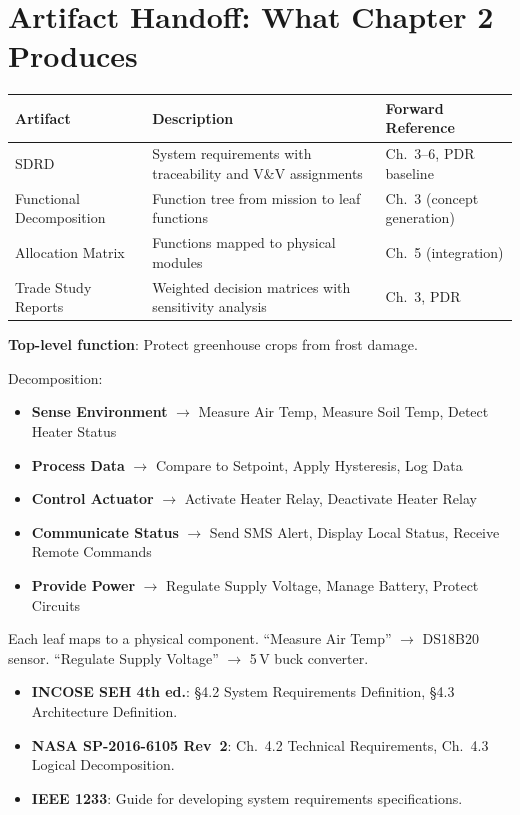 \documentclass[11pt,letterpaper,twoside,openany]{book}
\begin{document}
\section{Artifact Handoff: What Chapter 2 Produces}
\begin{table}[htbp]\centering\small
\begin{tabularx}{\textwidth}{l X l}
\toprule
\textbf{Artifact} & \textbf{Description} & \textbf{Forward Reference} \\
\midrule
SDRD & System requirements with traceability and V\&V assignments & Ch.~3--6, PDR baseline \\
Functional Decomposition & Function tree from mission to leaf functions & Ch.~3 (concept generation) \\
Allocation Matrix & Functions mapped to physical modules & Ch.~5 (integration) \\
Trade Study Reports & Weighted decision matrices with sensitivity analysis & Ch.~3, PDR \\
\bottomrule
\end{tabularx}
\end{table}


\begin{greenshieldbox}
\textbf{Top-level function}: Protect greenhouse crops from frost damage.

Decomposition:
\begin{itemize}[nosep,leftmargin=1.5em]
\item \textbf{Sense Environment} $\to$ Measure Air Temp, Measure Soil Temp, Detect Heater Status
\item \textbf{Process Data} $\to$ Compare to Setpoint, Apply Hysteresis, Log Data
\item \textbf{Control Actuator} $\to$ Activate Heater Relay, Deactivate Heater Relay
\item \textbf{Communicate Status} $\to$ Send SMS Alert, Display Local Status, Receive Remote Commands
\item \textbf{Provide Power} $\to$ Regulate Supply Voltage, Manage Battery, Protect Circuits
\end{itemize}
Each leaf maps to a physical component. ``Measure Air Temp'' $\to$ DS18B20 sensor. ``Regulate Supply Voltage'' $\to$ 5\,V buck converter.
\end{greenshieldbox}

\begin{keyconceptbox}
\begin{itemize}[nosep,leftmargin=1.5em]
\item \textbf{INCOSE SEH 4th ed.}: \S4.2 System Requirements Definition, \S4.3 Architecture Definition.
\item \textbf{NASA SP-2016-6105 Rev~2}: Ch.~4.2 Technical Requirements, Ch.~4.3 Logical Decomposition.
\item \textbf{IEEE 1233}: Guide for developing system requirements specifications.
\end{itemize}
\end{keyconceptbox}
\end{document}

